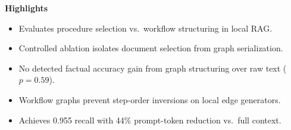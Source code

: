\documentclass[preprint,10pt]{elsarticle}
\begin{document}


\begin{center}
\begin{minipage}{0.9\textwidth}
\textbf{Highlights}
\begin{itemize}[leftmargin=*]
\item Evaluates procedure selection vs.\ workflow structuring in local RAG.
\item Controlled ablation isolates document selection from graph serialization.
\item No detected factual accuracy gain from graph structuring over raw text ($p=0.59$).
\item Workflow graphs prevent step-order inversions on local edge generators.
\item Achieves 0.955 recall with 44\% prompt-token reduction vs.\ full context.
\end{itemize}
\end{minipage}
\end{center}
\end{document}

